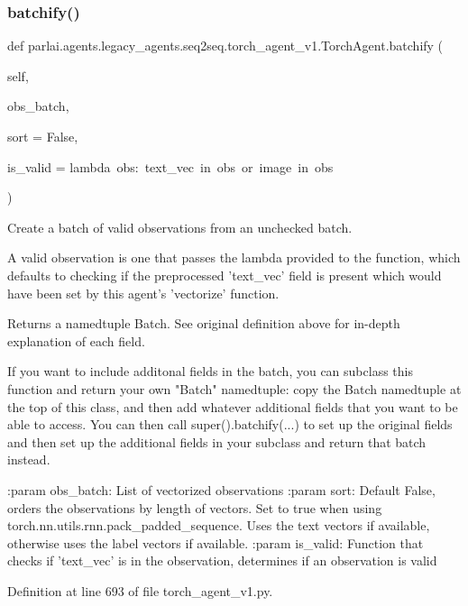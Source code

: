 \subsubsection{\texorpdfstring{batchify()}{batchify()}}
{\footnotesize\ttfamily def parlai.\+agents.\+legacy\+\_\+agents.\+seq2seq.\+torch\+\_\+agent\+\_\+v1.\+Torch\+Agent.\+batchify (\begin{DoxyParamCaption}\item[{}]{self,  }\item[{}]{obs\+\_\+batch,  }\item[{}]{sort = {\ttfamily False},  }\item[{}]{is\+\_\+valid = {\ttfamily lambda~obs\+:~\textquotesingle{}text\+\_\+vec\textquotesingle{}~in~obs~or~\textquotesingle{}image\textquotesingle{}~in~obs} }\end{DoxyParamCaption})}

\begin{DoxyVerb}Create a batch of valid observations from an unchecked batch.

A valid observation is one that passes the lambda provided to the
function, which defaults to checking if the preprocessed 'text_vec'
field is present which would have been set by this agent's 'vectorize'
function.

Returns a namedtuple Batch. See original definition above for in-depth
explanation of each field.

If you want to include additonal fields in the batch, you can subclass
this function and return your own "Batch" namedtuple: copy the Batch
namedtuple at the top of this class, and then add whatever additional
fields that you want to be able to access. You can then call
super().batchify(...) to set up the original fields and then set up the
additional fields in your subclass and return that batch instead.

:param obs_batch: List of vectorized observations
:param sort:      Default False, orders the observations by length of
          vectors. Set to true when using
          torch.nn.utils.rnn.pack_padded_sequence.
          Uses the text vectors if available, otherwise uses
          the label vectors if available.
:param is_valid:  Function that checks if 'text_vec' is in the
          observation, determines if an observation is valid
\end{DoxyVerb}
 

Definition at line 693 of file torch\+\_\+agent\+\_\+v1.\+py.



